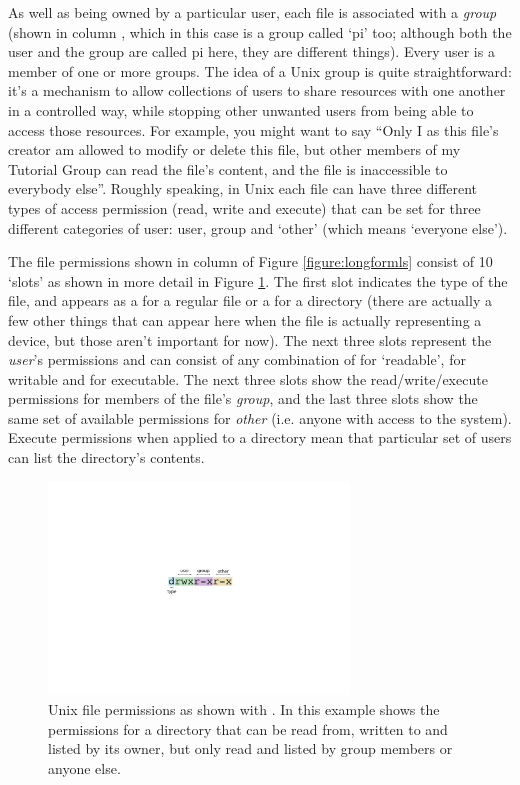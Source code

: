 As well as being owned by a particular user, each file is associated with a \textit{group} (shown in column \protect{}, which in this case is a group called `pi' too; although both the user and the group are called pi here, they are different things). Every user is a member of one or more groups. The idea of a Unix group is quite straightforward: it's a mechanism to allow collections of users to share resources with one another in a controlled way, while stopping other unwanted users from being able to access those resources. For example, you might want to say ``Only I as this file's creator am allowed to modify or delete this file, but other members of my Tutorial Group can read the file's content, and the file is inaccessible to everybody else''. Roughly speaking, in Unix each file can have three different types of access permission (read, write and execute) that can be set for three different categories of user: user, group and `other' (which means `everyone else').

The file permissions shown in column \protect{} of Figure \ref{figure:longformls} consist of 10 `slots' as shown in more detail in Figure \ref{figure:fileperms}. The first slot indicates the type of the file, and appears as a \ttout{-} for a regular file or a  for a directory (there are actually a few other things that can appear here when the file is actually representing a device, but those aren't important for now). The next three slots represent the \textit{user}'s permissions and can consist of any combination of  for `readable',  for writable and  for executable. The next three slots show the read/write/execute permissions for members of the file's \textit{group}, and the last three slots show the same set of available permissions for \textit{other} (i.e. anyone with access to the system). Execute permissions when applied to a directory mean that particular set of users can list the directory's contents. 


\begin{figure}
\centerline{\includegraphics[width=8cm]{images/filepermissions}}
\caption{Unix file permissions as shown with . In this example shows the permissions for a directory that can be read from, written to and listed by its owner, but only read and listed by group members or anyone else.}\label{figure:fileperms}
\end{figure}


